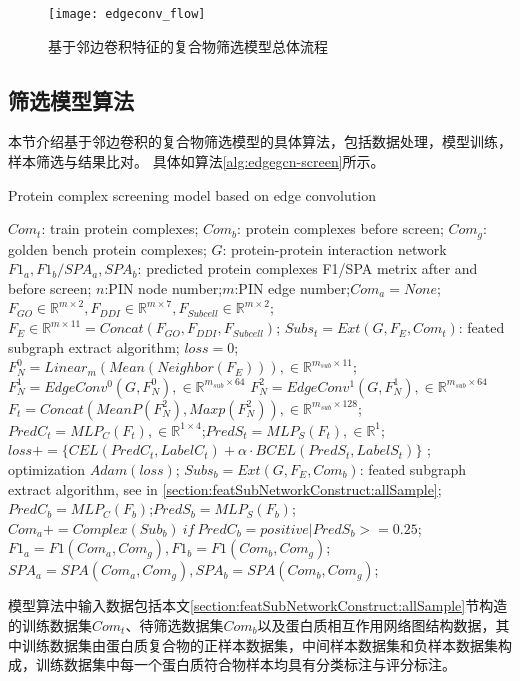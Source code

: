 \begin{figure}[htbp]
    \centering
    \texttt{[image: edgeconv\_flow]}
    \caption{基于邻边卷积特征的复合物筛选模型总体流程}
    \label{fig:edgeconv_flow}
\end{figure}

\subsection{筛选模型算法}
本节介绍基于邻边卷积的复合物筛选模型的具体算法，包括数据处理，模型训练，样本筛选与结果比对。
具体如算法\ref{alg:edgegcn-screen}所示。

\begin{algorithm}[h]
    \caption{Protein complex screening model based on edge convolution} %
    \label{alg:edgegcn-screen}
    \begin{algorithmic}[1]
        \Require
        $Com_t$: train protein complexes;
        $Com_b$: protein complexes before screen;
        $Com_g$: golden bench protein complexes;
        $G$: protein-protein interaction network
        \Ensure
        $F1_a,F1_b/SPA_a,SPA_b$: predicted protein complexes F1/SPA metrix after and before screen;
        \State $n$:PIN node number;$m$:PIN edge number;$Com_a=None$;
        \State $F_{GO}\in \mathbb{R}^{m\times 2},F_{DDI}\in \mathbb{R}^{m\times 7},F_{Subcell}\in \mathbb{R}^{m\times 2}$;
        \State $F_{E} \in \mathbb{R}^{m\times 11}=Concat(F_{GO},F_{DDI},F_{Subcell})$;
        \State $Subs_t=Ext(G,F_{E},Com_t)$: feated subgraph extract algorithm;
         $loss=0$;
        \State $F_{N}^0 =Linear_m(Mean(Neighbor(F_{E}))), \in \mathbb{R}^{m_{sub}\times 11}$;
        \State $F_{N}^1=EdgeConv^0(G,F_{N}^0), \in \mathbb{R}^{m_{sub}\times 64}$
        \State $F_{N}^2=EdgeConv^1(G,F_{N}^1), \in \mathbb{R}^{m_{sub}\times 64}$
        \State $F_t=Concat(MeanP(F_{N}^2),Maxp(F_{N}^2)), \in \mathbb{R}^{m_{sub}\times 128}$;
        \State $PredC_t=MLP_C(F_t),\in \mathbb{R}^{1\times 4}$;$PredS_t=MLP_S(F_t),\in \mathbb{R}^{1}$;
        \State $loss+=\{CEL(PredC_t,LabelC_t)+\alpha \cdot BCEL(PredS_t,LabelS_t)\}$
        \EndFor; optimization $Adam(loss)$;
        \EndFor
        \EndFor
        \State $Subs_b=Ext(G,F_{E},Com_b)$: feated subgraph extract algorithm, see in \ref{section:featSubNetworkConstruct:allSample};
         $PredC_b=MLP_C(F_b)$;$PredS_b=MLP_S(F_b)$;
        \State $Com_a+=Complex(Sub_b)~if~PredC_b=positive|PredS_b>=0.25$;
        \EndFor
        \State $F1_a=F1(Com_a,Com_g),F1_b=F1(Com_b,Com_g)$;
        \State $SPA_a=SPA(Com_a,Com_g),SPA_b=SPA(Com_b,Com_g)$;
    \end{algorithmic}
\end{algorithm}
模型算法中输入数据包括本文\ref{section:featSubNetworkConstruct:allSample}节构造的训练数据集$Com_t$、待筛选数据集$Com_b$以及蛋白质相互作用网络图结构数据，其中训练数据集由蛋白质复合物的正样本数据集，中间样本数据集和负样本数据集构成，训练数据集中每一个蛋白质符合物样本均具有分类标注与评分标注。

